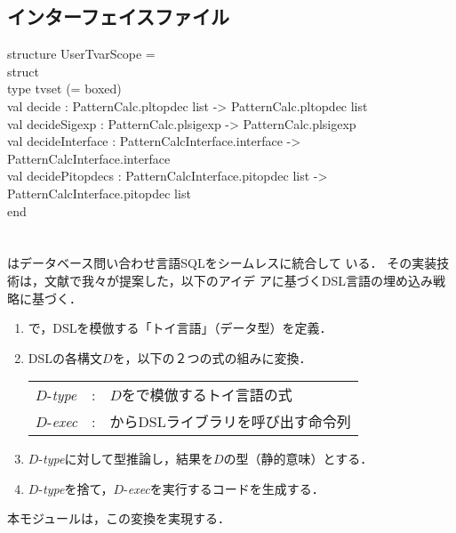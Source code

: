 \subsection{インターフェイスファイル}
\begin{program}
structure UserTvarScope =\\
\myem  struct\\
\myem\myem    type tvset (= boxed)\\
\myem\myem    val decide : PatternCalc.pltopdec list -> PatternCalc.pltopdec list\\
\myem\myem    val decideSigexp : PatternCalc.plsigexp -> PatternCalc.plsigexp\\
\myem\myem    val decideInterface : PatternCalcInterface.interface -> PatternCalcInterface.interface\\
\myem\myem    val decidePitopdecs :  PatternCalcInterface.pitopdec list -> PatternCalcInterface.pitopdec list\\
\myem  end
\end{program}
\else%
\fi%

\section{}
\ifjp%

	\smlsharp{}はデータベース問い合わせ言語SQLをシームレスに統合して
いる\cite{ohor89sigmod,bune96tods,ohori11}．
	その実装技術は，文献\cite{ohori11}で我々が提案した，以下のアイデ
アに基づくDSL言語の埋め込み戦略に基づく．
{
\newcommand{\dtype}{\mbox{$D$-{\it type}}}
\newcommand{\dexec}{\mbox{$D$-{\it exec}}}
\begin{enumerate}
\item \smlsharp{}で，DSLを模倣する「トイ言語」（データ型）を定義．
\item DSLの各構文$D$を，以下の２つの式の組みに変換．
\\[1ex]
\begin{tabular}{lcl}
\dtype &:& $D$を\smlsharp{}で模倣するトイ言語の式
\\
\dexec &:& \smlsharp{}からDSLライブラリを呼び出す命令列
\end{tabular}
\item \dtype{}に対して型推論し，結果を$D$の型（静的意味）とする．
\item \dtype{}を捨て，\dexec{}を実行するコードを生成する．
\end{enumerate}
}
	本モジュールは，この変換を実現する．

